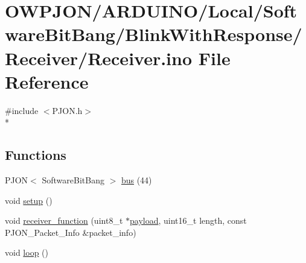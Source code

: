 \hypertarget{SoftwareBitBang_2BlinkWithResponse_2Receiver_2Receiver_8ino}{\section{O\-W\-P\-J\-O\-N/\-A\-R\-D\-U\-I\-N\-O/\-Local/\-Software\-Bit\-Bang/\-Blink\-With\-Response/\-Receiver/\-Receiver.ino File Reference}
\label{SoftwareBitBang_2BlinkWithResponse_2Receiver_2Receiver_8ino}
}
{\ttfamily \#include $<$P\-J\-O\-N.\-h$>$}\\*
\subsection*{Functions}
\begin{DoxyCompactItemize}
\item 
P\-J\-O\-N$<$ Software\-Bit\-Bang $>$ \hyperlink{SoftwareBitBang_2BlinkWithResponse_2Receiver_2Receiver_8ino_a538cbe881a4c2d02f3bd441059c41ec4}{bus} (44)
\item 
void \hyperlink{SoftwareBitBang_2BlinkWithResponse_2Receiver_2Receiver_8ino_a4fc01d736fe50cf5b977f755b675f11d}{setup} ()
\item 
void \hyperlink{SoftwareBitBang_2BlinkWithResponse_2Receiver_2Receiver_8ino_a76fc5e73c141f748dcc1809fdcfa1714}{receiver\-\_\-function} (uint8\-\_\-t $\ast$\hyperlink{Uno__Dragino__LoRa__GPS__Shield__TTN_8ino_a78a402d1762842473567de90b11ed256}{payload}, uint16\-\_\-t length, const P\-J\-O\-N\-\_\-\-Packet\-\_\-\-Info \&packet\-\_\-info)
\item 
void \hyperlink{SoftwareBitBang_2BlinkWithResponse_2Receiver_2Receiver_8ino_afe461d27b9c48d5921c00d521181f12f}{loop} ()
\end{DoxyCompactItemize}



